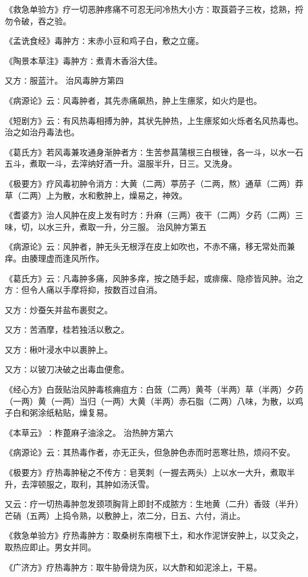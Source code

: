 \documentclass[a4paper,12pt,UTF8,twoside]{ctexbook}
\begin{document}
《救急单验方》疗一切恶肿疼痛不可忍无问冷热大小方∶取莨菪子三枚，捻熟，捋勿令破，吞之验。

《孟诜食经》毒肿方∶末赤小豆和鸡子白，敷之立瘥。

《陶景本草注》毒肿方∶煮青木香浴大佳。

又方∶服蓝汁。
治风毒肿方第四

《病源论》云∶风毒肿者，其先赤痛飙热，肿上生瘭浆，如火灼是也。

《短剧方》云∶有风热毒相搏为肿，其状先肿热，上生瘭浆如火烁者名风热毒也。治之如治丹毒法也。

《葛氏方》若风毒兼攻通身渐肿者方∶生苦参菖蒲根三白根锉，各一斗，以水一石五斗，煮取一斗，去滓纳好酒一升。温服半升，日三。又洗身。

《极要方》疗风毒初肿令消方∶大黄（二两）葶苈子（二两，熬）通草（二两）莽草（二两）上为散，水和敷肿上，燥易之，神效。

《耆婆方》治人风肿在皮上发有时方∶升麻（三两）夜干（二两）夕药（二两）三味，切，以水三升，煮取一升，分三服。
治风肿方第五

《病源论》云∶风肿者，肿无头无根浮在皮上如吹也，不赤不痛，移无常处而兼痒。由腠理虚而逢风所作。

《葛氏方》云∶凡毒肿多痛，风肿多痒，按之随手起，或痱瘰、隐疹皆风肿。治之方∶但令人痛以手摩将抑，按数百过自消。

又方∶炒蚕矢并盐布裹熨之。

又方∶苦酒摩，桂若独活以敷之。

又方∶楸叶浸水中以裹肿上。

又方∶以铍刀决破之出毒血便愈。

《经心方》白蔹贴治风肿毒核痈疽方∶白蔹（二两）黄芩（半两）草（半两）夕药（一两）黄（一两）当归（一两）大黄（半两）赤石脂（二两）八味，为散，以鸡子白和粥涂纸粘贴，燥复易。

《本草云》∶柞蓖麻子油涂之。
治热肿方第六

《病源论》云∶其热毒作者，亦无正头，但急肿色赤而时恶寒壮热，烦闷不安。

《极要方》疗热毒肿秘之不传方∶皂荚刺（一握去两头）上以水一大升，煮取半升，去滓顿服之，取利，其肿如汤沃雪。

又云∶疗一切热毒肿忽发颈项胸背上即封不成脓方∶生地黄（二升）香豉（半升）芒硝（五两）上捣令熟，以敷肿上，浓二分，日五、六付，消止。

《救急单验方》疗热毒肿方∶取桑树东南根下土，和水作泥饼安肿上，以艾灸之，取热应即止。男女并同。

《广济方》疗热毒肿方∶取牛胁骨烧为灰，以大酢和如泥涂上，干易。
\end{document}
